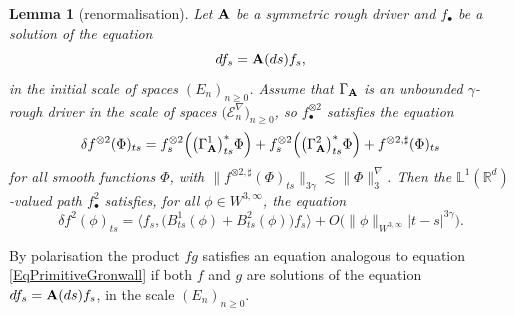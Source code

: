 \documentclass[11pt,a4paper]{amsart}
\newcommand{\RR}{\mathbb{R}}  \newcommand{\CC}{\mathbb{C}}  \newcommand{\LL}{\mathbb{L}}  \newcommand{\WW}{\mathbb{W}}
\newcommand{\mcE}{\mathcal{E}}
\renewcommand{\geq}{\geqslant}
\newcommand{\ssk}{\smallskip}
\newtheorem{lem}[thm]{\hspace{-0.15cm}  {\sc Lemma} }%
\numberwithin{equation}{section} %
\begin{document}
\ssk

\begin{lem}[renormalisation]
\label{Lemmarenormalisation}
Let $\bf A$ be a symmetric rough driver and $f_\bullet$ be a solution of the equation 
$$
df_s = {\bf A}(ds)f_s,
$$ 
in the initial scale of spaces $(E_n)_{n\geq 0}$. Assume that $\Gamma_{\bf A}$ is an unbounded $\gamma$-rough driver in the scale of spaces $\big(\mcE^\nabla_n\big)_{n\geq 0}$, so $f_\bullet^{\otimes 2}$ satisfies the equation
\begin{equation}
\label{EqFOtimes2}
\delta f^{\otimes 2}(\Phi)_{ts} = f^{\otimes 2}_s\Big(\big(\Gamma_{\bf A}^1\big)^*_{ts}\Phi\Big) + f^{\otimes 2}_s\Big(\big(\Gamma_{\bf A}^2\big)^*_{ts}\Phi\Big) +  f^{\otimes 2,\sharp}(\Phi)_{ts}
\end{equation}
for all smooth functions $\Phi$, with $\big\|f^{\otimes 2,\sharp}(\Phi)_{ts}\big\|_{3\gamma}\lesssim \big\| \Phi\big\|^\nabla_3$. Then the $\LL^1(\RR^d)$-valued path $f^2_\bullet$ satisfies, for all $\phi \in W^{3,\infty}$, the equation
\begin{equation} 
\label{EqPrimitiveGronwall}
\delta f^2(\phi)_{ts} =  \Big\langle f_s , \big(B^1_{ts}(\phi) + B^2_{ts}(\phi)\big) f_s\Big\rangle  + O \Big(\| \phi \|_{W^{3,\infty}} | t - s |^{3 \gamma}\Big) .
\end{equation}
 \end{lem}

\ssk
 
\noindent By polarisation the product $fg$ satisfies an equation analogous to equation \eqref{EqPrimitiveGronwall} if both $f$ and $g$ are solutions of the equation $df_s = {\bf A}(ds)f_s$, in the scale $(E_n)_{n\geq 0}$.

\bigskip
\end{document}
